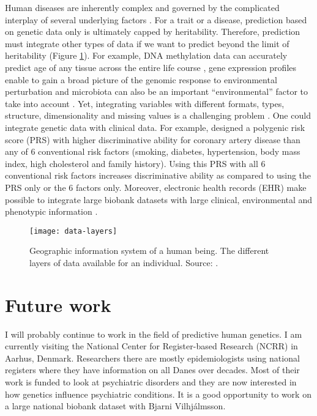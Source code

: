 Human diseases are inherently complex and governed by the complicated interplay of several underlying factors \cite[]{dey2013integration}.
For a trait or a disease, prediction based on genetic data only is ultimately capped by heritability.
Therefore, prediction must integrate other types of data if we want to predict beyond the limit of heritability (Figure \ref{fig:data-layers}).
For example, DNA methylation data can accurately predict age of any tissue across the entire life course \cite[]{horvath2013dna,horvath2018dna}, gene expression profiles enable to gain a broad picture of the genomic response to environmental perturbation \cite[]{gibson2008environmental} and microbiota can also be an important ``environmental'' factor to take into account \cite[]{backhed2004gut}. 
Yet, integrating variables with different formats, types, structure, dimensionality and missing values is a challenging problem \cite[]{dey2013integration}.
One could integrate genetic data with clinical data. For example, \cite{inouye2018genomic} designed a polygenic risk score (PRS) with higher discriminative ability for coronary artery disease than any of 6 conventional risk factors (smoking, diabetes, hypertension, body mass index, high cholesterol and family history).
Using this PRS with all 6 conventional risk factors increases discriminative ability as compared to using the PRS only or the 6 factors only.
Moreover, electronic health records (EHR) make possible to integrate large biobank datasets with large clinical, environmental and phenotypic information \cite[]{roden2016integrating}.

\begin{figure}[htpb]
\centerline{\texttt{[image: data-layers]}}
\caption{Geographic information system of a human being. The different layers of data available for an individual. Source: \cite{topol2014individualized}.}
\label{fig:data-layers}
\end{figure}


\section{Future work}

I will probably continue to work in the field of predictive human genetics. I am currently visiting the National Center for Register-based Research (NCRR) in Aarhus, Denmark. Researchers there are mostly epidemiologists using national registers where they have information on all Danes over decades. Most of their work is funded to look at psychiatric disorders and they are now interested in how genetics influence psychiatric conditions. It is a good opportunity to work on a large national biobank dataset with Bjarni Vilhj\'almsson.

